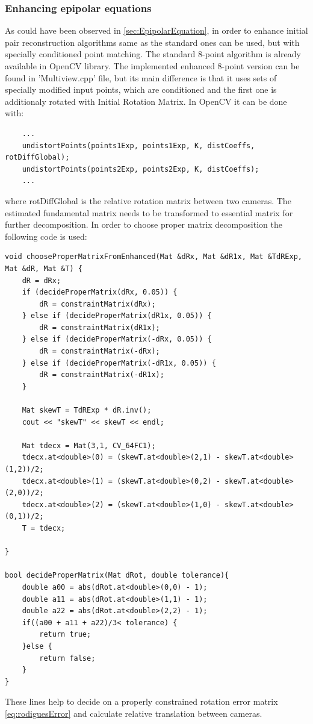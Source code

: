 \subsubsection{Enhancing epipolar equations}
As could have been observed in \ref{sec:EpipolarEquation}, in order to enhance initial pair reconstruction algorithms same as the standard ones can be used, but with specially conditioned point matching. The standard 8-point algorithm is already available in OpenCV library. The implemented enhanced 8-point version can be found in 'Multiview.cpp' file, but its main difference is that it uses sets of specially modified input points, which are conditioned and the first one is additionaly rotated with Initial Rotation Matrix. In OpenCV it can be done with:
\begin{lstlisting}
    ...
    undistortPoints(points1Exp, points1Exp, K, distCoeffs, rotDiffGlobal);
    undistortPoints(points2Exp, points2Exp, K, distCoeffs);
    ...
\end{lstlisting}
where rotDiffGlobal is the relative rotation matrix between two cameras. The estimated fundamental matrix needs to be transformed to essential matrix for further decomposition. In order to choose proper matrix decomposition the following code is used:
\begin{lstlisting}
void chooseProperMatrixFromEnhanced(Mat &dRx, Mat &dR1x, Mat &TdRExp, Mat &dR, Mat &T) {
    dR = dRx;
    if (decideProperMatrix(dRx, 0.05)) {
        dR = constraintMatrix(dRx);
    } else if (decideProperMatrix(dR1x, 0.05)) {
        dR = constraintMatrix(dR1x);
    } else if (decideProperMatrix(-dRx, 0.05)) {
        dR = constraintMatrix(-dRx);
    } else if (decideProperMatrix(-dR1x, 0.05)) {
        dR = constraintMatrix(-dR1x);
    }

    Mat skewT = TdRExp * dR.inv();
    cout << "skewT" << skewT << endl;

    Mat tdecx = Mat(3,1, CV_64FC1);
    tdecx.at<double>(0) = (skewT.at<double>(2,1) - skewT.at<double>(1,2))/2;
    tdecx.at<double>(1) = (skewT.at<double>(0,2) - skewT.at<double>(2,0))/2;
    tdecx.at<double>(2) = (skewT.at<double>(1,0) - skewT.at<double>(0,1))/2;
    T = tdecx;

}

bool decideProperMatrix(Mat dRot, double tolerance){
    double a00 = abs(dRot.at<double>(0,0) - 1);
    double a11 = abs(dRot.at<double>(1,1) - 1);
    double a22 = abs(dRot.at<double>(2,2) - 1);
    if((a00 + a11 + a22)/3< tolerance) {
        return true;
    }else {
        return false;
    }
}
\end{lstlisting}
These lines help to decide on a properly constrained rotation error matrix \ref{eq:rodiguesError} and calculate relative translation between cameras.
